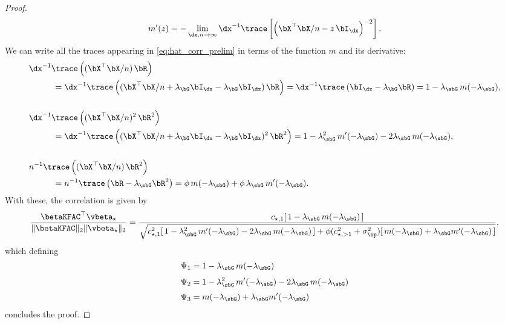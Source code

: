 \begin{proof}
    \begin{align*}
        m'(z) = - \lim_{\dx, n \to \infty} \dx^{-1} \trace\left[\left(\bX^\top\bX/n - z \,\bI_{\dx}\right)^{-2}\right].
    \end{align*}
    We can write all the traces appearing in \eqref{eq:hat_corr_prelim} in terms of the function $m$ and its derivative:
    \begin{align*}
        &\dx^{-1} \trace\left((\bX^\top\bX/n)\,\bR\right)\\ &\hspace{1cm}= \dx^{-1} \trace\left((\bX^\top\bX/n + \lambda_{\bG}\bI_{\dx}-\lambda_{\bG}\bI_{\dx})\,\bR\right) = \dx^{-1} \trace\left(\bI_{\dx} -\lambda_{\bG}\bR\right) = 1 - \lambda_\sbG \, m(-\lambda_\sbG),\\[0.5cm]
        &\dx^{-1} \trace\left((\bX^\top\bX/n)^2\,\bR^2\right)\\ &\hspace{1cm} =  \dx^{-1} \trace\left((\bX^\top\bX/n + \lambda_{\bG}\bI_{\dx}-\lambda_{\bG}\bI_{\dx})^2\,\bR^2\right)= 1 - \lambda_\sbG^2\, m'(-\lambda_\sbG) - 2\lambda_\sbG\, m(-\lambda_\sbG), \\[0.5cm]
        &n^{-1} \trace\left((\bX^\top\bX/n)\,\bR^2\right)\\ &\hspace{1cm} = n^{-1} \trace\left(\bR  - \lambda_\sbG\bR^2\right) = \phi\, m(-\lambda_\sbG) + \phi\,\lambda_\sbG\, m'(-\lambda_\sbG).
    \end{align*}
    With these, the correlation is given by
    \begin{align*}
        \frac{\betaKFAC^\top\vbeta_\star}{\|\betaKFAC\|_2  \|\vbeta_\star\|_2} = \frac{c_{\star,1} [\,1 - \lambda_\sbG\,m(-\lambda_\sbG)\,]}{\sqrt{c_{\star,1}^2[\,1 - \lambda_\sbG^2\, m'(-\lambda_\sbG) - 2\lambda_\sbG\, m(-\lambda_\sbG)\,] + \phi(c_{\star,>1}^2 + \sigma_\ep^2)[\,m(-\lambda_\sbG) + \lambda_\sbG m'(-\lambda_\sbG)\,]}},
    \end{align*}
    which defining
    \begin{align}
        \label{eq:psi_def}
        &\Psi_1 = 1 - \lambda_\sbG\,m(-\lambda_\sbG)\nonumber\\[0.1cm]
        &\Psi_2 = 1 - \lambda_\sbG^2\, m'(-\lambda_\sbG) - 2\lambda_\sbG\, m(-\lambda_\sbG)\nonumber\\[0.1cm]
        &\Psi_3 = m(-\lambda_\sbG) + \lambda_\sbG m'(-\lambda_\sbG)
    \end{align}
    concludes the proof.
\end{proof}
